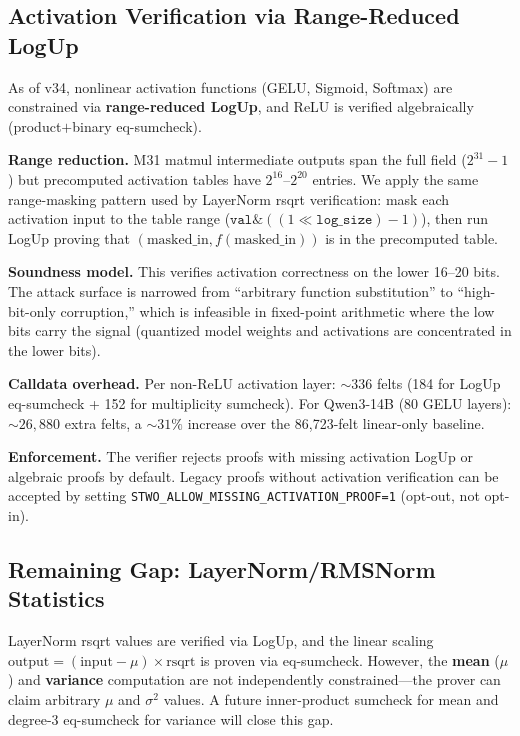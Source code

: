 \documentclass[10pt,twocolumn]{article}
\theoremstyle{definition}
\theoremstyle{remark}
\begin{document}
\subsection{Activation Verification via Range-Reduced LogUp}

As of v34, nonlinear activation functions (GELU, Sigmoid, Softmax)
are constrained via \textbf{range-reduced LogUp}, and ReLU is
verified algebraically (product$+$binary eq-sumcheck).

\textbf{Range reduction.}
M31 matmul intermediate outputs span the full field ($2^{31}\!-\!1$)
but precomputed activation tables have $2^{16}$--$2^{20}$ entries.
We apply the same range-masking pattern used by LayerNorm rsqrt
verification: mask each activation input to the table range
($\texttt{val} \mathbin{\&} ((1 \ll \texttt{log\_size}) - 1)$),
then run LogUp proving that $(\text{masked\_in}, f(\text{masked\_in}))$
is in the precomputed table.

\textbf{Soundness model.}
This verifies activation correctness on the lower 16--20 bits.
The attack surface is narrowed from ``arbitrary function substitution''
to ``high-bit-only corruption,'' which is infeasible in fixed-point
arithmetic where the low bits carry the signal (quantized model
weights and activations are concentrated in the lower bits).

\textbf{Calldata overhead.}
Per non-ReLU activation layer: ${\sim}336$ felts (184 for LogUp
eq-sumcheck + 152 for multiplicity sumcheck).
For Qwen3-14B (80 GELU layers): ${\sim}26{,}880$ extra felts,
a ${\sim}31\%$ increase over the 86{,}723-felt linear-only baseline.

\textbf{Enforcement.}
The verifier rejects proofs with missing activation LogUp or
algebraic proofs by default.
Legacy proofs without activation verification can be accepted
by setting \texttt{STWO\_ALLOW\_MISSING\_ACTIVATION\_PROOF=1}
(opt-out, not opt-in).

\subsection{Remaining Gap: LayerNorm/RMSNorm Statistics}

LayerNorm rsqrt values are verified via LogUp, and the linear
scaling $\text{output} = (\text{input} - \mu) \times \text{rsqrt}$
is proven via eq-sumcheck.
However, the \textbf{mean} ($\mu$) and \textbf{variance}
computation are not independently constrained---the prover
can claim arbitrary $\mu$ and $\sigma^2$ values.
A future inner-product sumcheck for mean and degree-3 eq-sumcheck
for variance will close this gap.
\end{document}
